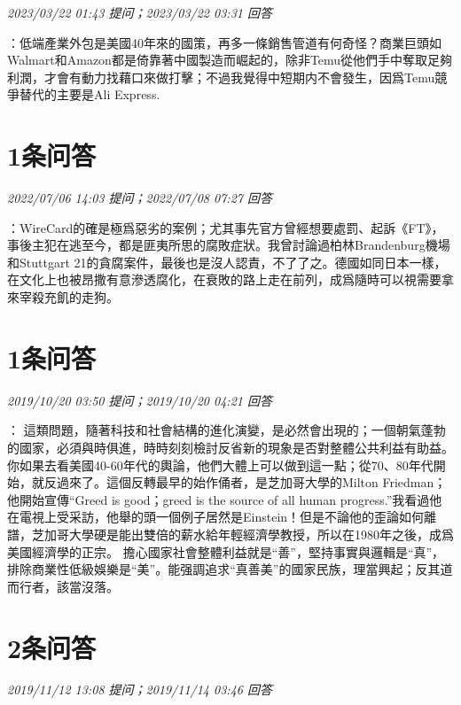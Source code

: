 \documentclass[twocolumn]{ctexart}
\begin{document}
\textit{\hfill\noindent\small 2023/03/22 01:43 提问；2023/03/22 03:31 回答}

：低端產業外包是美國40年來的國策，再多一條銷售管道有何奇怪？商業巨頭如Walmart和Amazon都是倚靠著中國製造而崛起的，除非Temu從他們手中奪取足夠利潤，才會有動力找藉口來做打擊；不過我覺得中短期内不會發生，因爲Temu競爭替代的主要是Ali Express.
\\

\section{1条问答}

\textit{\hfill\noindent\small 2022/07/06 14:03 提问；2022/07/08 07:27 回答}

：WireCard的確是極爲惡劣的案例；尤其事先官方曾經想要處罰、起訴《FT》，事後主犯在逃至今，都是匪夷所思的腐敗症狀。我曾討論過柏林Brandenburg機場和Stuttgart 21的貪腐案件，最後也是沒人認責，不了了之。德國如同日本一樣，在文化上也被昂撒有意滲透腐化，在衰敗的路上走在前列，成爲隨時可以視需要拿來宰殺充飢的走狗。
\\

\section{1条问答}

\textit{\hfill\noindent\small 2019/10/20 03:50 提问；2019/10/20 04:21 回答}

：
這類問題，隨著科技和社會結構的進化演變，是必然會出現的；一個朝氣蓬勃的國家，必須與時俱進，時時刻刻檢討反省新的現象是否對整體公共利益有助益。你如果去看美國40-60年代的輿論，他們大體上可以做到這一點；從70、80年代開始，就反過來了。這個反轉最早的始作俑者，是芝加哥大學的Milton Friedman；他開始宣傳“Greed is good；greed is the source of all human progress.”我看過他在電視上受采訪，他舉的頭一個例子居然是Einstein！但是不論他的歪論如何離譜，芝加哥大學硬是能出雙倍的薪水給年輕經濟學教授，所以在1980年之後，成爲美國經濟學的正宗。
擔心國家社會整體利益就是“善”，堅持事實與邏輯是“真”，排除商業性低級娛樂是“美”。能强調追求“真善美”的國家民族，理當興起；反其道而行者，該當沒落。
\\

\section{2条问答}

\textit{\hfill\noindent\small 2019/11/12 13:08 提问；2019/11/14 03:46 回答}
\end{document}
